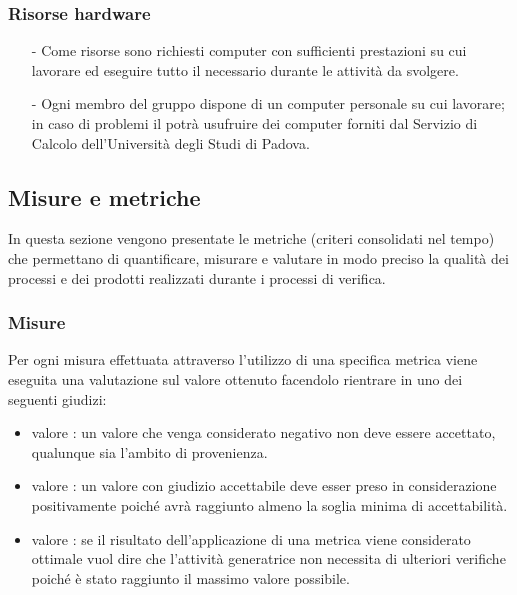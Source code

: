 \documentclass[a4paper, titlepage]{article}
\begin{document}
\subsubsection{Risorse hardware}
\begin{itemize}
\item[-] 
\newline Come risorse  sono richiesti computer con sufficienti prestazioni su cui lavorare ed eseguire tutto il  necessario durante le attività da svolgere.
\ 
\item[-] 
\newline Ogni membro del gruppo dispone di un computer personale su cui lavorare; in caso di problemi il  potrà usufruire dei computer forniti dal Servizio di Calcolo dell’Università degli Studi di Padova.
\end{itemize}

\subsection{Misure e metriche}
\label{sec:metr}
In questa sezione vengono presentate le metriche (criteri consolidati nel tempo) che permettano di quantificare, misurare e valutare in modo preciso la qualità dei processi e dei prodotti realizzati durante i processi di verifica.

\subsubsection{Misure}
Per ogni misura effettuata attraverso l'utilizzo di una specifica metrica viene eseguita una valutazione sul valore ottenuto facendolo rientrare in uno dei seguenti giudizi:
\begin{itemize}
\item valore : un valore che venga considerato negativo non deve essere accettato, qualunque sia l'ambito di provenienza.
\item valore \bold{accettabile}: un valore con giudizio accettabile deve esser preso in considerazione positivamente poiché avrà raggiunto almeno la soglia minima di accettabilità.
\item valore \bold{ottimale}: se il risultato dell'applicazione di una metrica viene considerato ottimale vuol dire che l'attività generatrice non necessita di ulteriori verifiche poiché è stato raggiunto il massimo valore possibile.
\end{itemize} 
\end{document}
